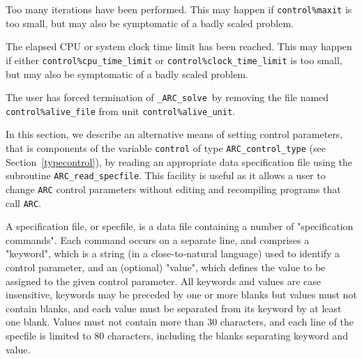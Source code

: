 \documentclass{galahad}
\newcommand{\packagename}{ARC}
\newcommand{\fullpackagename}{\libraryname\_\packagename}
\newcommand{\solver}{{\tt \fullpackagename\_solve}}
\begin{document}
\begin{description}
 Too many iterations have been performed.
  This may happen if
    {\tt control\%maxit} is too small, but may also be symptomatic of
    a badly scaled problem.

 The elapsed CPU or system clock time limit has been
    reached. This may happen if either {\tt control\%cpu\_time\_limit} or
    {\tt control\%clock\_time\_limit} is too small, but may also be symptomatic
    of a badly scaled problem.

 The user has forced termination of \solver\
     by removing the file named {\tt control\%a\-live\_file} from
     unit {\tt control\%alive\_unit}.

\end{description}


\galfeatures
\noindent In this section, we describe an alternative means of setting
control parameters, that is components of the variable {\tt control} of type
{\tt \packagename\_control\_type}
(see Section~\ref{typecontrol}),
by reading an appropriate data specification file using the
subroutine {\tt \packagename\_read\_specfile}. This facility
is useful as it allows a user to change  {\tt \packagename} control parameters
without editing and recompiling programs that call {\tt \packagename}.

A specification file, or specfile, is a data file containing a number of
"specification commands". Each command occurs on a separate line,
and comprises a "keyword",
which is a string (in a close-to-natural language) used to identify a
control parameter, and
an (optional) "value", which defines the value to be assigned to the given
control parameter. All keywords and values are case insensitive,
keywords may be preceded by one or more blanks but
values must not contain blanks, and
each value must be separated from its keyword by at least one blank.
Values must not contain more than 30 characters, and
each line of the specfile is limited to 80 characters,
including the blanks separating keyword and value.
\end{document}
